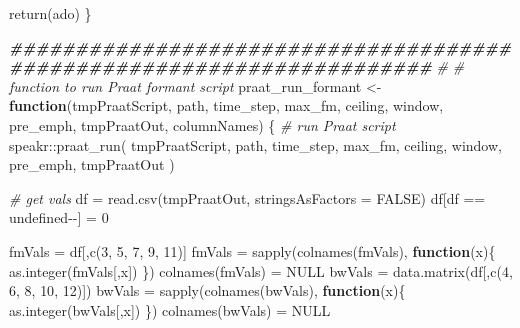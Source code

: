 \documentclass[
]{book}
\newenvironment{Shaded}{\begin{snugshade}}{\end{snugshade}}
\newcommand{\AttributeTok}[1]{\textcolor[rgb]{0.77,0.63,0.00}{#1}}
\newcommand{\CommentTok}[1]{\textcolor[rgb]{0.56,0.35,0.01}{\textit{#1}}}
\newcommand{\ConstantTok}[1]{\textcolor[rgb]{0.00,0.00,0.00}{#1}}
\newcommand{\ControlFlowTok}[1]{\textcolor[rgb]{0.13,0.29,0.53}{\textbf{#1}}}
\newcommand{\DecValTok}[1]{\textcolor[rgb]{0.00,0.00,0.81}{#1}}
\newcommand{\DocumentationTok}[1]{\textcolor[rgb]{0.56,0.35,0.01}{\textbf{\textit{#1}}}}
\newcommand{\FunctionTok}[1]{\textcolor[rgb]{0.00,0.00,0.00}{#1}}
\newcommand{\NormalTok}[1]{#1}
\newcommand{\OtherTok}[1]{\textcolor[rgb]{0.56,0.35,0.01}{#1}}
\newcommand{\SpecialCharTok}[1]{\textcolor[rgb]{0.00,0.00,0.00}{#1}}
\newcommand{\StringTok}[1]{\textcolor[rgb]{0.31,0.60,0.02}{#1}}
\begin{document}
\begin{Shaded}
\begin{Highlighting}[]
  \FunctionTok{return}\NormalTok{(ado)}
\NormalTok{\}}


\DocumentationTok{\#\#\#\#\#\#\#\#\#\#\#\#\#\#\#\#\#\#\#\#\#\#\#\#\#\#\#\#\#\#\#\#\#\#\#\#\#\#\#\#\#\#\#\#\#\#\#\#\#\#\#\#\#\#\#\#\#\#\#\#\#\#\#\#\#\#\#\#\#\#}
\CommentTok{\#}
\CommentTok{\# function to run Praat formant script}
\NormalTok{praat\_run\_formant }\OtherTok{\textless{}{-}} \ControlFlowTok{function}\NormalTok{(tmpPraatScript,}
\NormalTok{                             path,}
\NormalTok{                             time\_step,}
\NormalTok{                             max\_fm,}
\NormalTok{                             ceiling,}
\NormalTok{                             window,}
\NormalTok{                             pre\_emph,}
\NormalTok{                             tmpPraatOut,}
\NormalTok{                             columnNames) \{}
  \CommentTok{\# run Praat script}
\NormalTok{  speakr}\SpecialCharTok{::}\FunctionTok{praat\_run}\NormalTok{(}
\NormalTok{    tmpPraatScript,}
\NormalTok{    path,}
\NormalTok{    time\_step,}
\NormalTok{    max\_fm,}
\NormalTok{    ceiling,}
\NormalTok{    window,}
\NormalTok{    pre\_emph,}
\NormalTok{    tmpPraatOut}
\NormalTok{  )}

  \CommentTok{\# get vals}
\NormalTok{  df }\OtherTok{=} \FunctionTok{read.csv}\NormalTok{(tmpPraatOut, }\AttributeTok{stringsAsFactors =} \ConstantTok{FALSE}\NormalTok{)}
\NormalTok{  df[df }\SpecialCharTok{==} \StringTok{\textquotesingle{}{-}{-}undefined{-}{-}\textquotesingle{}}\NormalTok{] }\OtherTok{=} \DecValTok{0}

\NormalTok{  fmVals }\OtherTok{=}\NormalTok{ df[,}\FunctionTok{c}\NormalTok{(}\DecValTok{3}\NormalTok{, }\DecValTok{5}\NormalTok{, }\DecValTok{7}\NormalTok{, }\DecValTok{9}\NormalTok{, }\DecValTok{11}\NormalTok{)]}
\NormalTok{  fmVals }\OtherTok{=} \FunctionTok{sapply}\NormalTok{(}\FunctionTok{colnames}\NormalTok{(fmVals), }\ControlFlowTok{function}\NormalTok{(x)\{}
    \FunctionTok{as.integer}\NormalTok{(fmVals[,x])}
\NormalTok{  \})}
  \FunctionTok{colnames}\NormalTok{(fmVals) }\OtherTok{=} \ConstantTok{NULL}
\NormalTok{  bwVals }\OtherTok{=} \FunctionTok{data.matrix}\NormalTok{(df[,}\FunctionTok{c}\NormalTok{(}\DecValTok{4}\NormalTok{, }\DecValTok{6}\NormalTok{, }\DecValTok{8}\NormalTok{, }\DecValTok{10}\NormalTok{, }\DecValTok{12}\NormalTok{)])}
\NormalTok{  bwVals }\OtherTok{=} \FunctionTok{sapply}\NormalTok{(}\FunctionTok{colnames}\NormalTok{(bwVals), }\ControlFlowTok{function}\NormalTok{(x)\{}
    \FunctionTok{as.integer}\NormalTok{(bwVals[,x])}
\NormalTok{  \})}
  \FunctionTok{colnames}\NormalTok{(bwVals) }\OtherTok{=} \ConstantTok{NULL}


\end{Highlighting}
\end{Shaded}
\end{document}
